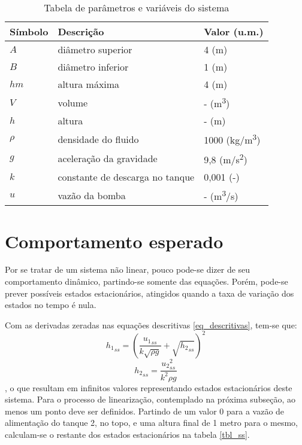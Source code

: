 \begin{table}[htb]
	\centering
	\caption{Tabela de parâmetros e variáveis do sistema}
	\begin{tabular} {|m{5em} m{15em} m{8em}|}
		\hline
		Símbolo & Descrição & Valor (u.m.) \\
		\hline
		$A$ & diâmetro superior & 4 (m) \\
		$B$ & diâmetro inferior & 1 (m) \\
		$hm$ & altura máxima & 4 (m) \\
		$V$ & volume & - (m\textsuperscript{3}) \\
		$h$ & altura & - (m) \\
		$\rho$ & densidade do fluido & 1000 (kg/m\textsuperscript{3}) \\
		$g$ & aceleração da gravidade & 9,8 (m/s\textsuperscript{2}) \\
		$k$ & constante de descarga no tanque & 0,001 (-)\\
		$u$ & vazão da bomba & - (m\textsuperscript{3}/s)\\
		\hline
	\end{tabular}
	\label{tbl_parameters}
\end{table}

\section{Comportamento esperado} \label{comportamento_esperado}

Por se tratar de um sistema não linear, pouco pode-se dizer de seu comportamento dinâmico, partindo-se somente das equações. Porém, pode-se prever possíveis estados estacionários, atingidos quando a taxa de variação dos estados no tempo é nula.

Com as derivadas zeradas nas equações descritivas \ref{eq_descritivas}, tem-se que:
\begin{equation}
{h_1}_{ss} = (\frac{{u_1}_{ss}}{k\sqrt{\rho g}} + \sqrt{{h_2}_{ss}})^2
\end{equation}
\begin{equation}
{h_2}_{ss} = \frac{{u_2}_{ss}^2}{k^2 \rho g}
\end{equation}
, o que resultam em infinitos valores representando estados estacionários deste sistema. Para o processo de linearização, contemplado na próxima subseção, ao menos um ponto deve ser definidos. Partindo de um valor 0 para a vazão de alimentação do tanque 2, no topo, e uma altura final de 1 metro para o mesmo, calculam-se o restante dos estados estacionários na tabela \ref{tbl_ss}.

